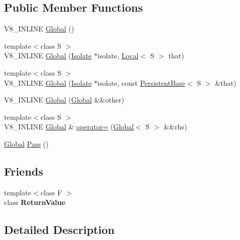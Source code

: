 \subsection*{Public Member Functions}
\begin{DoxyCompactItemize}
\item 
V8\+\_\+\+I\+N\+L\+I\+N\+E \hyperlink{classv8_1_1Global_ab1efdf25ff6305e67f3266a6fe90527e}{Global} ()
\item 
{\footnotesize template$<$class S $>$ }\\V8\+\_\+\+I\+N\+L\+I\+N\+E \hyperlink{classv8_1_1Global_a8434bb6729eb4cd0cd85ad81bd8344ad}{Global} (\hyperlink{classv8_1_1Isolate}{Isolate} $\ast$isolate, \hyperlink{classv8_1_1Local}{Local}$<$ S $>$ that)
\item 
{\footnotesize template$<$class S $>$ }\\V8\+\_\+\+I\+N\+L\+I\+N\+E \hyperlink{classv8_1_1Global_a6243ecb28bb97d066065796fa28f7415}{Global} (\hyperlink{classv8_1_1Isolate}{Isolate} $\ast$isolate, const \hyperlink{classv8_1_1PersistentBase}{Persistent\+Base}$<$ S $>$ \&that)
\item 
V8\+\_\+\+I\+N\+L\+I\+N\+E \hyperlink{classv8_1_1Global_ab8f3c754a58146e6db67012cd74a49cb}{Global} (\hyperlink{classv8_1_1Global}{Global} \&\&other)
\item 
{\footnotesize template$<$class S $>$ }\\V8\+\_\+\+I\+N\+L\+I\+N\+E \hyperlink{classv8_1_1Global}{Global} \& \hyperlink{classv8_1_1Global_a9d3d7d8f10ad23e413f2027cc15ab209}{operator=} (\hyperlink{classv8_1_1Global}{Global}$<$ S $>$ \&\&rhs)
\item 
\hyperlink{classv8_1_1Global}{Global} \hyperlink{classv8_1_1Global_a914903149cc752468d4a3a11b6089c7e}{Pass} ()
\end{DoxyCompactItemize}
\subsection*{Friends}
\begin{DoxyCompactItemize}
\item 
\hypertarget{classv8_1_1Global_a53f604d3d6f2dc0647df33c9979f116a}{}{\footnotesize template$<$class F $>$ }\\class {\bfseries Return\+Value}\label{classv8_1_1Global_a53f604d3d6f2dc0647df33c9979f116a}

\end{DoxyCompactItemize}


\subsection{Detailed Description}
